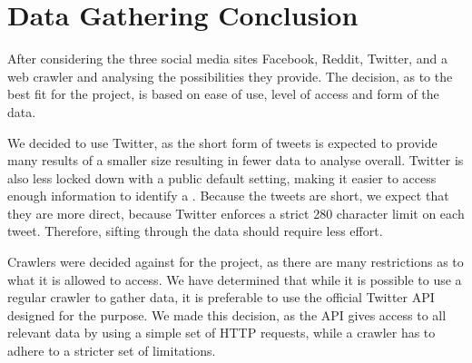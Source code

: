 \section{Data Gathering Conclusion}\label{sec:social-media-conclusion}
After considering the three social media sites Facebook, Reddit, Twitter, and a
web crawler and analysing the possibilities they provide. The decision, as to
the best fit for the project, is based on ease of use, level of access and form
of the data.\nl

We decided to use Twitter, as the short form of tweets is expected to provide
many results of a smaller size resulting in fewer data to analyse overall.
Twitter is also less locked down with a public default setting, making it easier
to access enough information to identify a \fb. Because the tweets are short, we
expect that they are more direct, because Twitter enforces a strict 280
character limit on each tweet. Therefore, sifting through the data should
require less effort.\nl

Crawlers were decided against for the project, as there are many restrictions as
to what it is allowed to access. We have determined that while it is possible to
use a regular crawler to gather data, it is preferable to use the official
Twitter \ac{API} designed for the purpose. We made this decision, as the
\ac{API} gives access to all relevant data by using a simple set of \ac{HTTP}
requests, while a crawler has to adhere to a stricter set of limitations.

